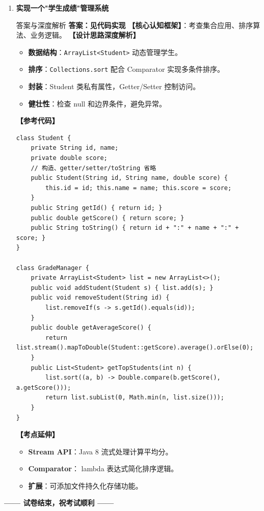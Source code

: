 \documentclass[12pt, a4paper]{ctexart}
\newcommand{\code}[1]{\texttt{\color{myblue}#1}}
\begin{document}
\begin{enumerate}[label=\arabic*.]
\item \textbf{实现一个"学生成绩"管理系统}
\begin{bluebox}{答案与深度解析}
\textbf{答案：见代码实现}
\textbf{【核心认知框架】}：考查集合应用、排序算法、业务逻辑。
\textbf{【设计思路深度解析】}
\begin{itemize}[leftmargin=*, nosep]
    \item \textbf{数据结构}：\code{ArrayList<Student>} 动态管理学生。
    \item \textbf{排序}：\code{Collections.sort} 配合 Comparator 实现多条件排序。
    \item \textbf{封装}：Student 类私有属性，Getter/Setter 控制访问。
    \item \textbf{健壮性}：检查 null 和边界条件，避免异常。
\end{itemize}
\textbf{【参考代码】}
\begin{lstlisting}
class Student {
    private String id, name;
    private double score;
    // 构造、getter/setter/toString 省略
    public Student(String id, String name, double score) {
        this.id = id; this.name = name; this.score = score;
    }
    public String getId() { return id; }
    public double getScore() { return score; }
    public String toString() { return id + ":" + name + ":" + score; }
}

class GradeManager {
    private ArrayList<Student> list = new ArrayList<>();
    public void addStudent(Student s) { list.add(s); }
    public void removeStudent(String id) {
        list.removeIf(s -> s.getId().equals(id));
    }
    public double getAverageScore() {
        return list.stream().mapToDouble(Student::getScore).average().orElse(0);
    }
    public List<Student> getTopStudents(int n) {
        list.sort((a, b) -> Double.compare(b.getScore(), a.getScore()));
        return list.subList(0, Math.min(n, list.size()));
    }
}
\end{lstlisting}
\textbf{【考点延伸】}
\begin{itemize}[leftmargin=*, nosep]
    \item \textbf{Stream API}：Java 8 流式处理计算平均分。
    \item \textbf{Comparator}： lambda 表达式简化排序逻辑。
    \item \textbf{扩展}：可添加文件持久化存储功能。
\end{itemize}
\end{bluebox}
\end{enumerate}

\begin{center}
    {\large\bfseries\color{myblue} —— 试卷结束，祝考试顺利 ——}
\end{center}
\end{document}
